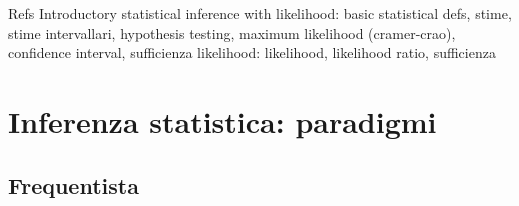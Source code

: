 \begin{frame}{Refs}
Introductory statistical inference with likelihood: basic statistical defs, stime, stime intervallari, hypothesis testing, maximum likelihood (cramer-crao), confidence interval, sufficienza 
likelihood: likelihood, likelihood ratio, sufficienza
\end{frame}

\section{Inferenza statistica: paradigmi}

\subsection{Frequentista}

